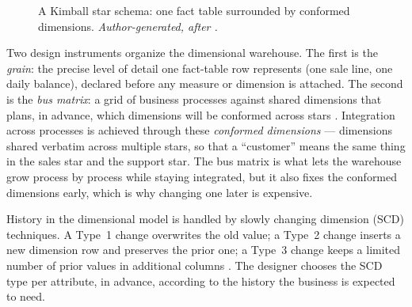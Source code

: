 \begin{figure}[H]
\centering
{}
\caption{A Kimball star schema: one fact table surrounded by conformed dimensions. \textit{Author-generated, after \parencite{kimball2013}.}}
\label{fig:ch1-star}
\end{figure}

Two design instruments organize the dimensional warehouse. The first is the \textit{grain}: the precise level of detail one fact-table row represents (one sale line, one daily balance), declared before any measure or dimension is attached. The second is the \textit{bus matrix}: a grid of business processes against shared dimensions that plans, in advance, which dimensions will be conformed across stars \parencite{kimball2013}. Integration across processes is achieved through these \textit{conformed dimensions} --- dimensions shared verbatim across multiple stars, so that a ``customer'' means the same thing in the sales star and the support star. The bus matrix is what lets the warehouse grow process by process while staying integrated, but it also fixes the conformed dimensions early, which is why changing one later is expensive.

History in the dimensional model is handled by slowly changing dimension (SCD) techniques. A Type~1 change overwrites the old value; a Type~2 change inserts a new dimension row and preserves the prior one; a Type~3 change keeps a limited number of prior values in additional columns \parencite{kimball2013}. The designer chooses the SCD type per attribute, in advance, according to the history the business is expected to need.

